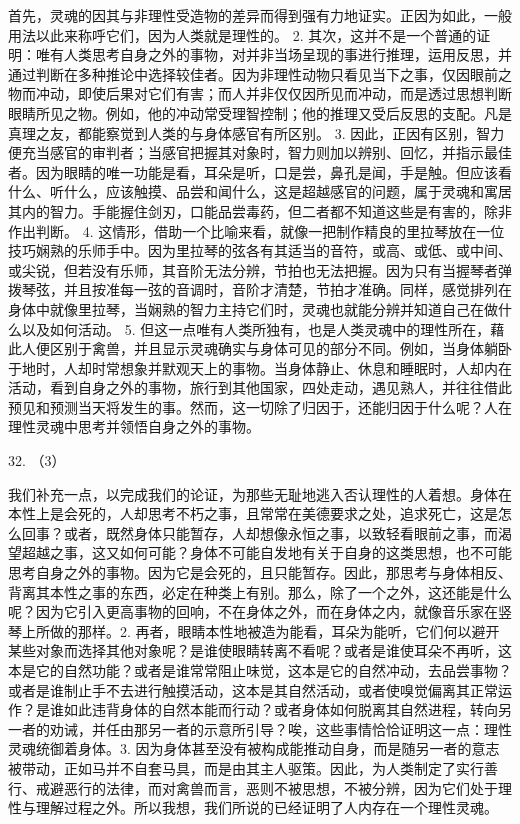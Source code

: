 首先，灵魂的因其与非理性受造物的差异而得到强有力地证实。正因为如此，一般用法以此来称呼它们，因为人类就是理性的。 2. 其次，这并不是一个普通的证明：唯有人类思考自身之外的事物，对并非当场呈现的事进行推理，运用反思，并通过判断在多种推论中选择较佳者。因为非理性动物只看见当下之事，仅因眼前之物而冲动，即使后果对它们有害；而人并非仅仅因所见而冲动，而是透过思想判断眼睛所见之物。例如，他的冲动常受理智控制；他的推理又受后反思的支配。凡是真理之友，都能察觉到人类的与身体感官有所区别。 3. 因此，正因有区别，智力便充当感官的审判者；当感官把握其对象时，智力则加以辨别、回忆，并指示最佳者。因为眼睛的唯一功能是看，耳朵是听，口是尝，鼻孔是闻，手是触。但应该看什么、听什么，应该触摸、品尝和闻什么，这是超越感官的问题，属于灵魂和寓居其内的智力。手能握住剑刃，口能品尝毒药，但二者都不知道这些是有害的，除非作出判断。 4. 这情形，借助一个比喻来看，就像一把制作精良的里拉琴放在一位技巧娴熟的乐师手中。因为里拉琴的弦各有其适当的音符，或高、或低、或中间、或尖锐，但若没有乐师，其音阶无法分辨，节拍也无法把握。因为只有当握琴者弹拨琴弦，并且按准每一弦的音调时，音阶才清楚，节拍才准确。同样，感觉排列在身体中就像里拉琴，当娴熟的智力主持它们时，灵魂也就能分辨并知道自己在做什么以及如何活动。 5. 但这一点唯有人类所独有，也是人类灵魂中的理性所在，藉此人便区别于禽兽，并且显示灵魂确实与身体可见的部分不同。例如，当身体躺卧于地时，人却时常想象并默观天上的事物。当身体静止、休息和睡眠时，人却内在活动，看到自身之外的事物，旅行到其他国家，四处走动，遇见熟人，并往往借此预见和预测当天将发生的事。然而，这一切除了归因于，还能归因于什么呢？人在理性灵魂中思考并领悟自身之外的事物。\par

32. （3）\par

我们补充一点，以完成我们的论证，为那些无耻地逃入否认理性的人着想。身体在本性上是会死的，人却思考不朽之事，且常常在美德要求之处，追求死亡，这是怎么回事？或者，既然身体只能暂存，人却想像永恒之事，以致轻看眼前之事，而渴望超越之事，这又如何可能？身体不可能自发地有关于自身的这类思想，也不可能思考自身之外的事物。因为它是会死的，且只能暂存。因此，那思考与身体相反、背离其本性之事的东西，必定在种类上有别。那么，除了一个之外，这还能是什么呢？因为它引入更高事物的回响，不在身体之外，而在身体之内，就像音乐家在竖琴上所做的那样。2. 再者，眼睛本性地被造为能看，耳朵为能听，它们何以避开某些对象而选择其他对象呢？是谁使眼睛转离不看呢？或者是谁使耳朵不再听，这本是它的自然功能？或者是谁常常阻止味觉，这本是它的自然冲动，去品尝事物？或者是谁制止手不去进行触摸活动，这本是其自然活动，或者使嗅觉偏离其正常运作？是谁如此违背身体的自然本能而行动？或者身体如何脱离其自然进程，转向另一者的劝诫，并任由那另一者的示意所引导？唉，这些事情恰恰证明这一点：理性灵魂统御着身体。3. 因为身体甚至没有被构成能推动自身，而是随另一者的意志被带动，正如马并不自套马具，而是由其主人驱策。因此，为人类制定了实行善行、戒避恶行的法律，而对禽兽而言，恶则不被思想，不被分辨，因为它们处于理性与理解过程之外。所以我想，我们所说的已经证明了人内存在一个理性灵魂。\par

